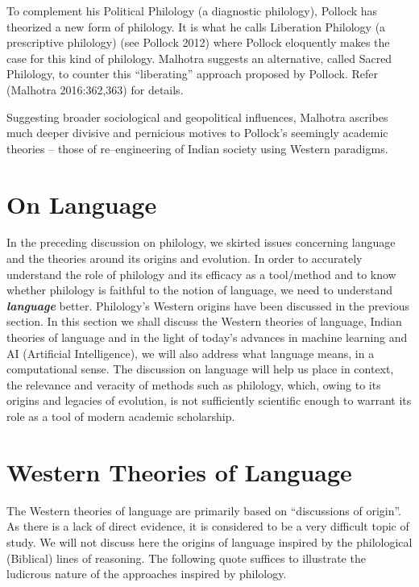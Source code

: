 To complement his Political Philology (a diagnostic philology), Pollock has theorized a new form of philology. It is what he calls Liberation Philology (a prescriptive philology) (see Pollock 2012) where Pollock eloquently makes the case for this kind of philology. Malhotra suggests an alternative, called Sacred Philology, to counter this “liberating” approach proposed by Pollock. Refer (Malhotra 2016:362,363) for details.

Suggesting broader sociological and geopolitical influences, Malhotra ascribes much deeper divisive and pernicious motives to Pollock’s seemingly academic theories – those of re–engineering of Indian society using Western paradigms.


\section*{On Language}

\vskip -6pt

In the preceding discussion on philology, we skirted issues concerning language and the theories around its origins and evolution. In order to accurately understand the role of philology and its efficacy as a tool/method and to know whether philology is faithful to the notion of language, we need to understand \textbf{\textit{language}} better. Philology’s Western origins have been discussed in the previous section. In this section we shall discuss the Western theories of language, Indian theories of language and in the light of today’s advances in machine learning and AI (Artificial Intelligence), we will also address what language means, in a computational sense. The discussion on language will help us place in context, the relevance and veracity of methods such as philology, which, owing to its origins and legacies of evolution, is not sufficiently scientific enough to warrant its role as a tool of modern academic scholarship.


\section*{Western Theories of Language}

\vskip -6pt

The Western theories of language are primarily based on “discussions of origin”. As there is a lack of direct evidence, it is considered to be a very difficult topic of study. We will not discuss here the origins of language inspired by the philological (Biblical) lines of reasoning. The following quote suffices to illustrate the ludicrous nature of the approaches inspired by philology.

